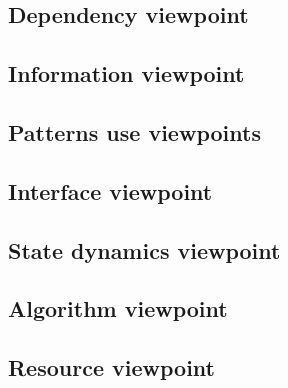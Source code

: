 \documentclass[letterpaper, 10pt, draftclsnofoot, compsoc, onecolumn]{IEEEtran}
\begin{document}
\vspace{1pc}
\subsection{Dependency viewpoint}
\vspace{1pc}
{\noindent \par}

\vspace{1pc}
\subsection{Information viewpoint}
\vspace{1pc}
{\noindent \par}

\vspace{1pc}
\subsection{Patterns use viewpoints}
\vspace{1pc}
{\noindent \par}

\vspace{1pc}
\subsection{Interface viewpoint}
\vspace{1pc}
{\noindent \par}

\vspace{1pc}
\subsection{State dynamics viewpoint}
\vspace{1pc}
{\noindent \par}

\vspace{1pc}
\subsection{Algorithm viewpoint}
\vspace{1pc}
{\noindent \par}

\vspace{1pc}
\subsection{Resource viewpoint}
\vspace{1pc}
{\noindent \par}
\end{document}
